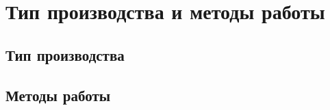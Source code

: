 \section{Тип производства и методы работы}

\subsection{Тип производства}

\subsection{Методы работы}